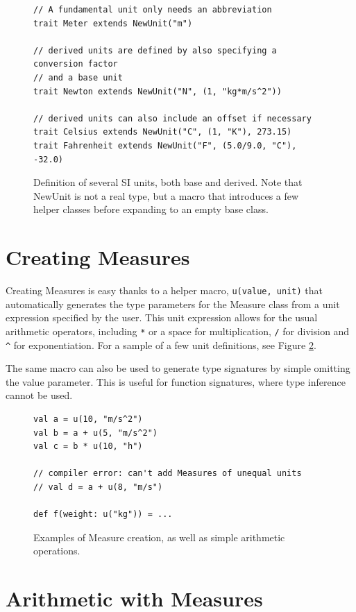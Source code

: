 \documentclass[12pt,oneside,a4paper]{scrbook}
\begin{document}
\begin{figure}
\begin{verbatim}
// A fundamental unit only needs an abbreviation
trait Meter extends NewUnit("m")

// derived units are defined by also specifying a conversion factor
// and a base unit
trait Newton extends NewUnit("N", (1, "kg*m/s^2"))

// derived units can also include an offset if necessary
trait Celsius extends NewUnit("C", (1, "K"), 273.15)
trait Fahrenheit extends NewUnit("F", (5.0/9.0, "C"), -32.0)
\end{verbatim}
\caption{Definition of several SI units, both base and derived. Note that NewUnit is not a real type, but a macro that introduces a few helper classes before expanding to an empty base class.}
\label{code:scala_define_units}
\end{figure}



\section{Creating Measures}
\label{sec:measure_creation}
Creating Measures is easy thanks to a helper macro, \verb|u(value, unit)| that automatically generates the type parameters for the Measure class from a unit expression specified by the user. This unit expression allows for the usual arithmetic operators, including \verb|*| or a space for multiplication, \verb|/| for division and \verb|^| for exponentiation. For a sample of a few unit definitions, see Figure \ref{code:scala_create_measure}.

The same macro can also be used to generate type signatures by simple omitting the value parameter. This is useful for function signatures, where type inference cannot be used.

\begin{figure}
\begin{verbatim}
val a = u(10, "m/s^2")
val b = a + u(5, "m/s^2")
val c = b * u(10, "h")

// compiler error: can't add Measures of unequal units
// val d = a + u(8, "m/s")

def f(weight: u("kg")) = ...
\end{verbatim}
\caption{Examples of Measure creation, as well as simple arithmetic operations.}
\label{code:scala_create_measure}
\end{figure}

\section{Arithmetic with Measures}
\end{document}
